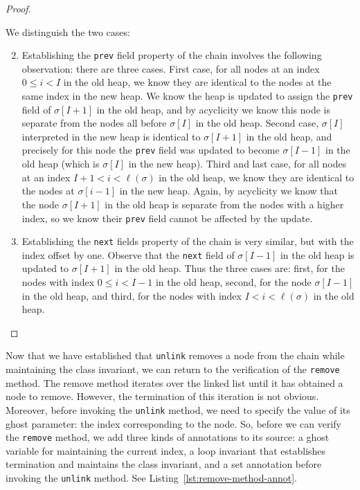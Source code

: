\documentclass[runningheads]{llncs}
\theoremstyle{remark}
\begin{document}
\begin{proof}
\begin{enumerate}
    We distinguish the two cases:
    \begin{enumerate}\setcounter{enumii}{1}
        \item Establishing the \texttt{prev} field property of the chain involves the following observation: there are three cases. First case, for all nodes at an index $0\leq i< I$ in the old heap, we know they are identical to the nodes at the same index in the new heap. We know the heap is updated to assign the \texttt{prev} field of $\sigma[I+1]$ in the old heap, and by acyclicity we know this node is separate from the nodes all before $\sigma[I]$ in the old heap. Second case, $\sigma[I]$ interpreted in the new heap is identical to $\sigma[I+1]$ in the old heap, and precisely for this node the \texttt{prev} field was updated to become $\sigma[I-1]$ in the old heap (which is $\sigma[I]$ in the new heap). Third and last case, for all nodes at an index $I+1<i<\ell(\sigma)$ in the old heap, we know they are identical to the nodes at $\sigma[i-1]$ in the new heap. Again, by acyclicity we know that the node $\sigma[I+1]$ in the old heap is separate from the nodes with a higher index, so we know their \texttt{prev} field cannot be affected by the update.
        \item Establishing the \texttt{next} fields property of the chain is very similar, but with the index offset by one. Observe that the \texttt{next} field of $\sigma[I-1]$ in the old heap is updated to $\sigma[I+1]$ in the old heap. Thus the three cases are: first, for the nodes with index $0\leq i < I-1$ in the old heap, second, for the node $\sigma[I-1]$ in the old heap, and third, for the nodes with index $I<i<\ell(\sigma)$ in the old heap.
    \end{enumerate}
\end{enumerate}
\vspace*{-24pt}
\end{proof}

Now that we have established that \texttt{unlink} removes a node from the chain while maintaining the class invariant, we can return to the verification of the \texttt{remove} method. The remove method iterates over the linked list until it has obtained a node to remove. However, the termination of this iteration is not obvious. Moreover, before invoking the \texttt{unlink} method, we need to specify the value of its ghost parameter: the index corresponding to the node. So, before we can verify the \texttt{remove} method, we add three kinds of annotations to its source: a ghost variable for maintaining the current index, a loop invariant that establishes termination and maintains the class invariant, and a set annotation before invoking the \texttt{unlink} method. See Listing~\ref{lst:remove-method-annot}.
\end{document}
